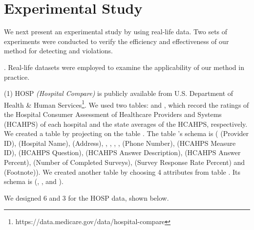 \section{Experimental Study}
\label{sec-exp}

We next present an experimental study by using real-life data. Two sets of experiments were conducted to verify the efficiency and effectiveness of our method for detecting \pCFDs and \pCINDs violations.

. Real-life datasets were employed to examine the applicability of our method in practice.

(1) HOSP \textit{(Hospital Compare)} is publicly available from U.S. Department of Health
\& Human Services\footnote{https://data.medicare.gov/data/hospital-compare}. We used two tables:  and , which record the ratings of the Hospital Consumer Assessment of Healthcare Providers and Systems (HCAHPS) of each hospital and the state averages of the HCAHPS, respectively. We created a table  by projecting on the table . The table 's schema is ( (Provider ID),  (Hospital Name),  (Address), , , , ,  (Phone Number),  (HCAHPS Measure ID),  (HCAHPS Question),  (HCAHPS Answer Description),  (HCAHPS Answer Percent),  (Number of Completed Surveys),  (Survey Response Rate Percent) and  (Footnote)). We created another table  by choosing 4 attributes from table . Its schema is (, ,  and ).

We designed 6 \pCFDs and 3 \pCINDs for the HOSP data, shown below.

